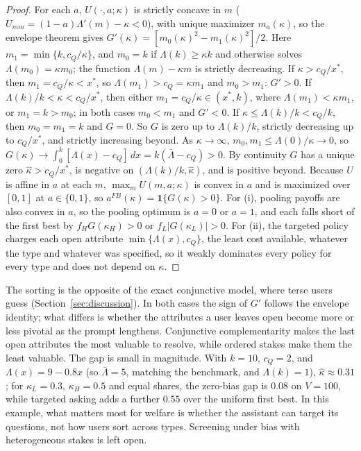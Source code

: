 \documentclass[11pt]{article}
\begin{document}
\begin{proof}
For each $a$, $U(\cdot,a;\kappa)$ is strictly concave in $m$ ($U_{mm} = (1-a)\Lambda'(m) - \kappa < 0$), with unique maximizer $m_a(\kappa)$, so the envelope theorem gives $G'(\kappa) = [m_0(\kappa)^2 - m_1(\kappa)^2]/2$. Here $m_1 = \min\{k, c_Q/\kappa\}$, and $m_0 = k$ if $\Lambda(k) \ge \kappa k$ and otherwise solves $\Lambda(m_0) = \kappa m_0$; the function $\Lambda(m) - \kappa m$ is strictly decreasing. If $\kappa > c_Q/x^*$, then $m_1 = c_Q/\kappa < x^*$, so $\Lambda(m_1) > c_Q = \kappa m_1$ and $m_0 > m_1$: $G' > 0$. If $\Lambda(k)/k < \kappa < c_Q/x^*$, then either $m_1 = c_Q/\kappa \in (x^*, k)$, where $\Lambda(m_1) < \kappa m_1$, or $m_1 = k > m_0$; in both cases $m_0 < m_1$ and $G' < 0$. If $\kappa \le \Lambda(k)/k < c_Q/k$, then $m_0 = m_1 = k$ and $G = 0$. So $G$ is zero up to $\Lambda(k)/k$, strictly decreasing up to $c_Q/x^*$, and strictly increasing beyond. As $\kappa \to \infty$, $m_0, m_1 \le \Lambda(0)/\kappa \to 0$, so $G(\kappa) \to \int_0^k [\Lambda(x) - c_Q]\,dx = k(\bar\Lambda - c_Q) > 0$. By continuity $G$ has a unique zero $\hat\kappa > c_Q/x^*$, is negative on $(\Lambda(k)/k, \hat\kappa)$, and is positive beyond. Because $U$ is affine in $a$ at each $m$, $\max_m U(m,a;\kappa)$ is convex in $a$ and is maximized over $[0,1]$ at $a \in \{0,1\}$, so $a^{FB}(\kappa) = \mathbf{1}\{G(\kappa) > 0\}$. For (i), pooling payoffs are also convex in $a$, so the pooling optimum is $a = 0$ or $a = 1$, and each falls short of the first best by $f_H G(\kappa_H) > 0$ or $f_L |G(\kappa_L)| > 0$. For (ii), the targeted policy charges each open attribute $\min\{\Lambda(x), c_Q\}$, the least cost available, whatever the type and whatever was specified, so it weakly dominates every policy for every type and does not depend on $\kappa$.
\end{proof}

The sorting is the opposite of the exact conjunctive model, where terse users guess (Section~\ref{sec:discussion}). In both cases the sign of $G'$ follows the envelope identity; what differs is whether the attributes a user leaves open become more or less pivotal as the prompt lengthens. Conjunctive complementarity makes the last open attributes the most valuable to resolve, while ordered stakes make them the least valuable. The gap is small in magnitude. With $k = 10$, $c_Q = 2$, and $\Lambda(x) = 9 - 0.8x$ (so $\bar\Lambda = 5$, matching the benchmark, and $\Lambda(k) = 1$), $\hat\kappa \approx 0.31$; for $\kappa_L = 0.3$, $\kappa_H = 0.5$ and equal shares, the zero-bias gap is $0.08$ on $V = 100$, while targeted asking adds a further $0.55$ over the uniform first best. In this example, what matters most for welfare is whether the assistant can target its questions, not how users sort across types. Screening under bias with heterogeneous stakes is left open.
\end{document}

